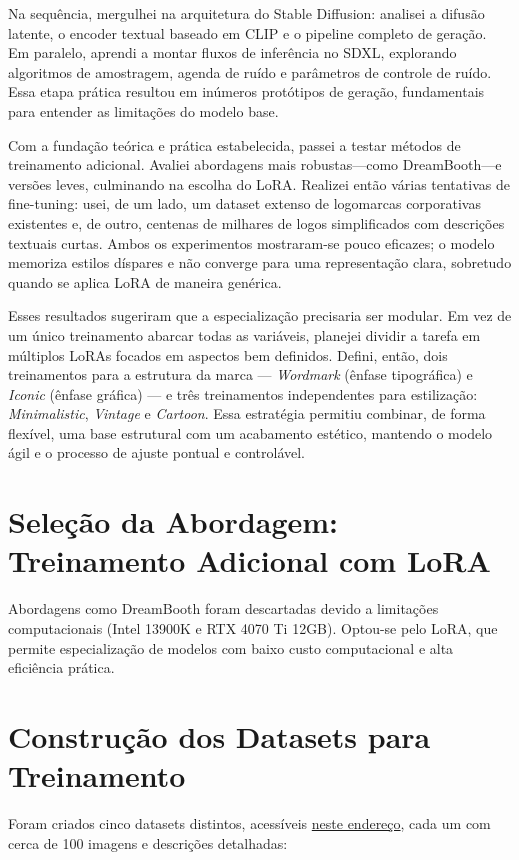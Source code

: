 \documentclass[12pt, %
openright, 
oneside, %
a4paper,    %
brazil]{facom-ufu-abntex2}
\begin{document}
Na sequência, mergulhei na arquitetura do Stable Diffusion: analisei a difusão latente, o encoder textual baseado em CLIP e o pipeline completo de geração. Em paralelo, aprendi a montar fluxos de inferência no SDXL, explorando algoritmos de amostragem, agenda de ruído e parâmetros de controle de ruído. Essa etapa prática resultou em inúmeros protótipos de geração, fundamentais para entender as limitações do modelo base.

Com a fundação teórica e prática estabelecida, passei a testar métodos de treinamento adicional. Avaliei abordagens mais robustas—como DreamBooth—e versões leves, culminando na escolha do LoRA. Realizei então várias tentativas de fine-tuning: usei, de um lado, um dataset extenso de logomarcas corporativas existentes e, de outro, centenas de milhares de logos simplificados com descrições textuais curtas. Ambos os experimentos mostraram-se pouco eficazes; o modelo memoriza estilos díspares e não converge para uma representação clara, sobretudo quando se aplica LoRA de maneira genérica.

Esses resultados sugeriram que a especialização precisaria ser modular. Em vez de um único treinamento abarcar todas as variáveis, planejei dividir a tarefa em múltiplos LoRAs focados em aspectos bem definidos. Defini, então, dois treinamentos para a estrutura da marca — \emph{Wordmark} (ênfase tipográfica) e \emph{Iconic} (ênfase gráfica) — e três treinamentos independentes para estilização: \emph{Minimalistic}, \emph{Vintage} e \emph{Cartoon}. Essa estratégia permitiu combinar, de forma flexível, uma base estrutural com um acabamento estético, mantendo o modelo ágil e o processo de ajuste pontual e controlável.

\section{Seleção da Abordagem: Treinamento Adicional com LoRA}

Abordagens como DreamBooth foram descartadas devido a limitações computacionais (Intel 13900K e RTX 4070 Ti 12GB). Optou-se pelo LoRA, que permite especialização de modelos com baixo custo computacional e alta eficiência prática.

\section{Construção dos Datasets para Treinamento}

Foram criados cinco datasets distintos, acessíveis \href{https://github.com/tornellihenrique/tcc-stable-diffusion-logos/tree/main/lora-datasets}{neste endereço}, cada um com cerca de 100 imagens e descrições detalhadas:
\end{document}
